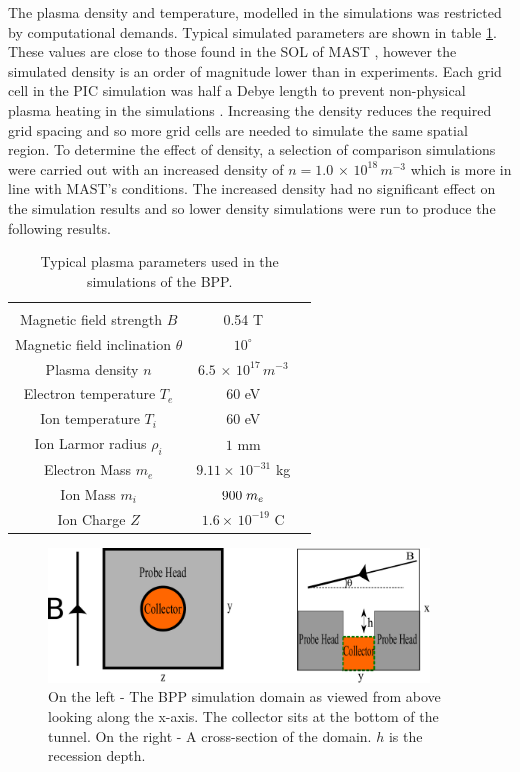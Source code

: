 The plasma density and temperature, modelled in the simulations was restricted by computational demands. Typical simulated parameters are shown in table \ref{tab:sim_parameters}. These values are close to those found in the SOL of MAST \cite{MAST_SOL}, however the simulated density is an order of magnitude lower than in experiments. Each grid cell in the PIC simulation was half a Debye length to prevent non-physical plasma heating in the simulations \cite{bible}. Increasing the density reduces the required grid spacing and so more grid cells are needed to simulate the same spatial region. To determine the effect of density, a selection of comparison simulations were carried out with an increased density of $n = 1.0 \, \times \, 10^{18} \, m^{-3}$ which is more in line with MAST's conditions. The increased density had no significant effect on the simulation results and so lower density simulations were run to produce the following results.
\begin{table}[]
	\centering

	\begin{tabular}{c|c|c}  %
		 &  &  \\ %
		Magnetic field strength $B$             & 0.54 T                                               \\
		Magnetic field inclination $\theta$                & $10^{\circ} $      \\
		Plasma density $n$               & $6.5 \, \times \, 10^{17} \, m^{-3}$ \\ 
		Electron temperature $T_e$ &      $ 60$ eV     \\ 
		Ion temperature  $T_i$ &     $60$ eV  \\  
		Ion Larmor radius $\rho_i$  &  $1$ mm  \\
		Electron Mass $m_e$ &  $9.11 \times \, 10^{-31}$ kg \\
		Ion Mass $m_i$ &  $900 \hspace{1mm} m_e$ \\
		Ion Charge $Z$ & $1.6 \times \, 10^{-19}$ C \\
	\end{tabular} 
		\caption{Typical plasma parameters used in the simulations of the BPP. }
		\label{tab:sim_parameters}
\end{table}


 
 
\begin{figure}[H]
\centering
\includegraphics[width=0.9\textwidth]{figure1.pdf}
\caption{On the left - The BPP simulation domain as viewed from above looking along the x-axis. The collector sits at the bottom of the tunnel. On the right - A cross-section of the domain. $h$ is the recession depth. }
\label{fig:bpp_both_views}
\end{figure}


